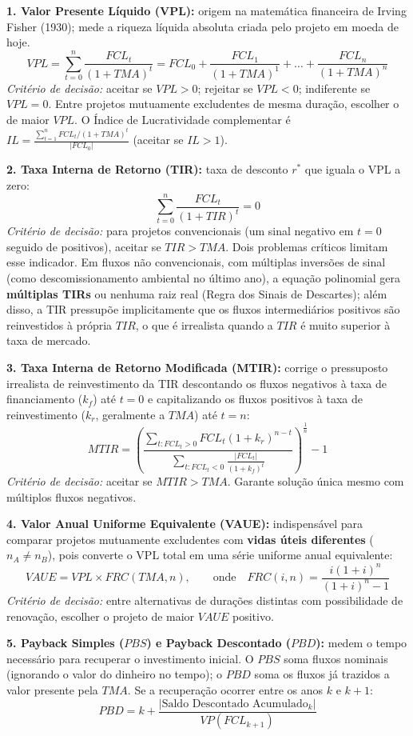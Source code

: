 \begin{boxFormula}
\textbf{1. Valor Presente Líquido (VPL):} origem na matemática financeira de Irving Fisher (1930); mede a riqueza líquida absoluta criada pelo projeto em moeda de hoje.
\[
  VPL = \sum_{t=0}^{n} \frac{FCL_t}{(1 + TMA)^t} = FCL_0 + \frac{FCL_1}{(1+TMA)^1} + \dots + \frac{FCL_n}{(1+TMA)^n}
\]
\textit{Critério de decisão:} aceitar se $VPL > 0$; rejeitar se $VPL < 0$; indiferente se $VPL = 0$. Entre projetos mutuamente excludentes de mesma duração, escolher o de maior $VPL$. O Índice de Lucratividade complementar é $IL = \frac{\sum_{t=1}^{n} FCL_t/(1+TMA)^t}{|FCL_0|}$ (aceitar se $IL > 1$).

\vspace{5pt}
\textbf{2. Taxa Interna de Retorno (TIR):} taxa de desconto $r^*$ que iguala o VPL a zero:
\[
  \sum_{t=0}^{n} \frac{FCL_t}{(1 + TIR)^t} = 0
\]
\textit{Critério de decisão:} para projetos convencionais (um sinal negativo em $t=0$ seguido de positivos), aceitar se $TIR > TMA$. Dois problemas críticos limitam esse indicador. Em fluxos não convencionais, com múltiplas inversões de sinal (como descomissionamento ambiental no último ano), a equação polinomial gera \textbf{múltiplas TIRs} ou nenhuma raiz real (Regra dos Sinais de Descartes); além disso, a TIR pressupõe implicitamente que os fluxos intermediários positivos são reinvestidos à própria $TIR$, o que é irrealista quando a $TIR$ é muito superior à taxa de mercado.

\vspace{5pt}
\textbf{3. Taxa Interna de Retorno Modificada (MTIR):} corrige o pressuposto irrealista de reinvestimento da TIR descontando os fluxos negativos à taxa de financiamento ($k_f$) até $t=0$ e capitalizando os fluxos positivos à taxa de reinvestimento ($k_r$, geralmente a $TMA$) até $t=n$:
\[
  MTIR = \left( \frac{\sum_{t: FCL_t > 0} FCL_t (1 + k_r)^{n-t}}{\sum_{t: FCL_t < 0} \frac{|FCL_t|}{(1 + k_f)^t}} \right)^{\frac{1}{n}} - 1
\]
\textit{Critério de decisão:} aceitar se $MTIR > TMA$. Garante solução única mesmo com múltiplos fluxos negativos.

\vspace{5pt}
\textbf{4. Valor Anual Uniforme Equivalente (VAUE):} indispensável para comparar projetos mutuamente excludentes com \textbf{vidas úteis diferentes} ($n_A \neq n_B$), pois converte o VPL total em uma série uniforme anual equivalente:
\[
  VAUE = VPL \times FRC(TMA, n), \qquad \text{onde} \quad FRC(i, n) = \frac{i(1+i)^n}{(1+i)^n - 1}
\]
\textit{Critério de decisão:} entre alternativas de durações distintas com possibilidade de renovação, escolher o projeto de maior $VAUE$ positivo.

\vspace{5pt}
\textbf{5. Payback Simples ($PBS$) e Payback Descontado ($PBD$):} medem o tempo necessário para recuperar o investimento inicial. O $PBS$ soma fluxos nominais (ignorando o valor do dinheiro no tempo); o $PBD$ soma os fluxos já trazidos a valor presente pela $TMA$. Se a recuperação ocorrer entre os anos $k$ e $k+1$:
\[
  PBD = k + \frac{|\text{Saldo Descontado Acumulado}_{k}|}{VP(FCL_{k+1})}
\]
\end{boxFormula}

